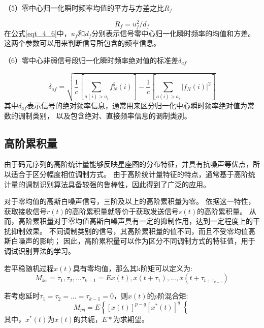 （5）零中心归一化瞬时频率均值的平方与方差之比$R_f$\par
\begin{equation}
\label{eqt_4_6}
R_f = u_f^2 / d_f
\end{equation}
在公式\ref{eqt_4_6}中，$u_f$和$d_f$分别表示信号零中心归一化瞬时频率的均值和方差。
这两个参数可以用来判断信号所包含的频率信息。\par

（6）零中心非弱信号段归一化瞬时频率绝对值的标准差$\delta_{af}$\par
\begin{equation}
\label{eqt_4_7}
\delta_{af} = \sqrt{\frac{1}{c}\left[\sum_{a(i)>a_i} f_N^2(i)\right]
	- \frac{1}{c}\left[\sum_{a(i)>a_i} \left|f_N(i)\right|^2\right]}
\end{equation}
其中$\delta_{af}$表示信号的绝对频率信息，通常用来区分归一化中心瞬时频率绝对值为常数的调制类别，
以及包含绝对、直接频率信息的调制类别。\par

\subsection{高阶累积量}

由于码元序列的高阶统计量能够反映星座图的分布特征，并具有抗噪声等优点，所以适合于区分幅度相位调制方式。
由于高阶统计量特征的特点，通常基于高阶统计量的调制识别算法具备较强的鲁棒性，因此得到了广泛的应用。\par

对于零均值的高斯白噪声信号，三阶及以上的高阶累积量为零。
依据这一特性，获取接收信号$r(t)$的高阶累积量就等价于获取发送信号$s(t)$的高阶累积量。
从而，高阶累积量对于零均值高斯白噪声具有一定的抑制作用，达到一定程度上的干扰抑制效果。
不同调制类别的信号，其高阶累积量的值不同，而且不受零均值高斯白噪声的影响；
因此，高阶累积量可以作为区分不同调制方式的特征值，用于调试识别算法的学习。\par

若平稳随机过程$x(t)$具有零均值，那么其k阶矩可以定义为:
\begin{equation}
\label{eqt_4_8}
M_{kx} = \tau_1, \tau_2, ... \tau_{k-1} = E{x(t), x(t+\tau_1), ..., x(t+\tau_{t+\tau_{k-1}})}
\end{equation}

若考虑延时$\tau_1 = \tau_2 = ... = \tau_{k-1} = 0$，则$x(t)$的$p$阶混合矩:
\begin{equation}
\label{eqt_4_9}
M_{pq} = E\left\lbrace \left[ x(t)\right]^{p-q} 
\left[ x^*(t)\right]^{q}\right\lbrace 
\end{equation}
其中，$x^*(t)$为$x(t)$的共轭，$E{*}$为求期望。\par

